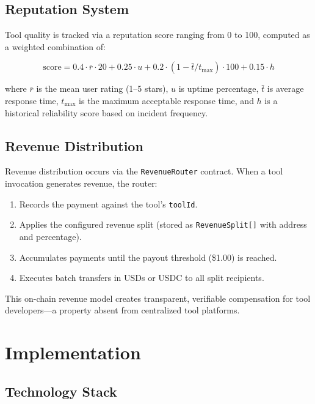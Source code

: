 \documentclass[11pt]{article}
\begin{document}
\subsection{Reputation System}

Tool quality is tracked via a reputation score ranging from 0 to 100, computed as a weighted combination of:

\begin{equation}
\text{score} = 0.4 \cdot \bar{r} \cdot 20 + 0.25 \cdot u + 0.2 \cdot (1 - \bar{t}/t_{\max}) \cdot 100 + 0.15 \cdot h
\label{eq:reputation}
\end{equation}

where $\bar{r}$ is the mean user rating (1--5 stars), $u$ is uptime percentage, $\bar{t}$ is average response time, $t_{\max}$ is the maximum acceptable response time, and $h$ is a historical reliability score based on incident frequency.

\subsection{Revenue Distribution}

Revenue distribution occurs via the \texttt{RevenueRouter} contract. When a tool invocation generates revenue, the router:
\begin{enumerate}[leftmargin=*]
  \item Records the payment against the tool's \texttt{toolId}.
  \item Applies the configured revenue split (stored as \texttt{RevenueSplit[]} with address and percentage).
  \item Accumulates payments until the payout threshold (\$1.00) is reached.
  \item Executes batch transfers in USDs or USDC to all split recipients.
\end{enumerate}

This on-chain revenue model creates transparent, verifiable compensation for tool developers---a property absent from centralized tool platforms.

\section{Implementation}
\label{sec:implementation}

\subsection{Technology Stack}
\end{document}
